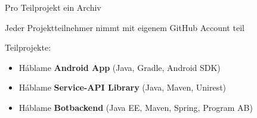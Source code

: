 \begin{frame}
\begin{block}{}
	Pro Teilprojekt	ein Archiv
\end{block}
\begin{block}{}
	Jeder Projektteilnehmer nimmt mit eigenem GitHub Account teil
\end{block}
\begin{block}{}
	Teilprojekte:
	\begin{itemize}\itemsep0pt
		\item Háblame \textbf{Android App} (Java, Gradle, Android SDK)
		\item Háblame \textbf{Service-API Library} (Java, Maven, Unirest)
		\item Háblame \textbf{Botbackend} (Java EE, Maven, Spring, Program AB)
	\end{itemize}
\end{block}
\end{frame}